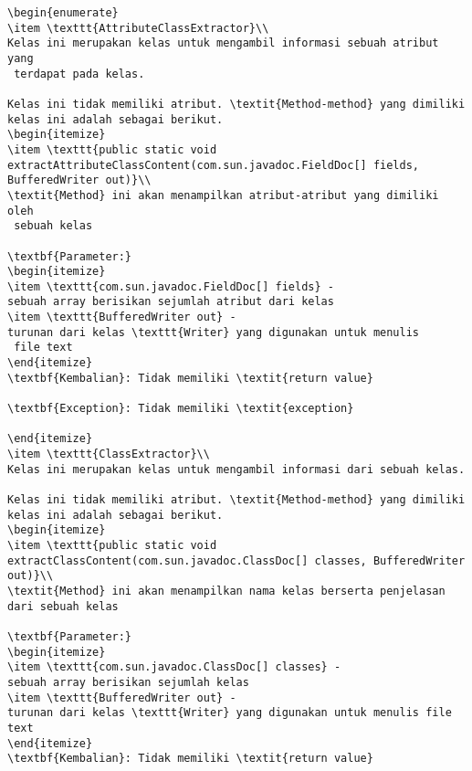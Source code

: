 \begin{lstlisting}[caption=Hasil Pengujian Kedua]
\begin{enumerate}
\item \texttt{AttributeClassExtractor}\\ 
Kelas ini merupakan kelas untuk mengambil informasi sebuah atribut yang
 terdapat pada kelas.

Kelas ini tidak memiliki atribut. \textit{Method-method} yang dimiliki kelas ini adalah sebagai berikut.
\begin{itemize}
\item \texttt{public static void extractAttributeClassContent(com.sun.javadoc.FieldDoc[] fields, BufferedWriter out)}\\ 
\textit{Method} ini akan menampilkan atribut-atribut yang dimiliki oleh
 sebuah kelas

\textbf{Parameter:}
\begin{itemize}
\item \texttt{com.sun.javadoc.FieldDoc[] fields} - 
sebuah array berisikan sejumlah atribut dari kelas
\item \texttt{BufferedWriter out} - 
turunan dari kelas \texttt{Writer} yang digunakan untuk menulis
 file text
\end{itemize}
\textbf{Kembalian}: Tidak memiliki \textit{return value}

\textbf{Exception}: Tidak memiliki \textit{exception}

\end{itemize}
\item \texttt{ClassExtractor}\\ 
Kelas ini merupakan kelas untuk mengambil informasi dari sebuah kelas.

Kelas ini tidak memiliki atribut. \textit{Method-method} yang dimiliki kelas ini adalah sebagai berikut.
\begin{itemize}
\item \texttt{public static void extractClassContent(com.sun.javadoc.ClassDoc[] classes, BufferedWriter out)}\\ 
\textit{Method} ini akan menampilkan nama kelas berserta penjelasan dari sebuah kelas

\textbf{Parameter:}
\begin{itemize}
\item \texttt{com.sun.javadoc.ClassDoc[] classes} - 
sebuah array berisikan sejumlah kelas
\item \texttt{BufferedWriter out} - 
turunan dari kelas \texttt{Writer} yang digunakan untuk menulis file text
\end{itemize}
\textbf{Kembalian}: Tidak memiliki \textit{return value}


\end{lstlisting}
